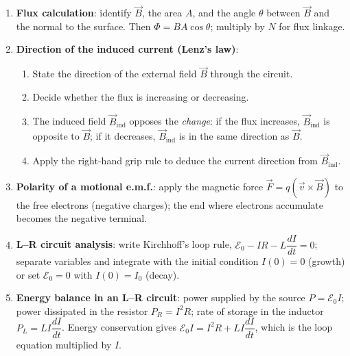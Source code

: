 \documentclass[11pt]{article}
\newcounter{popsec}
\newcounter{popsub}
\newcommand{\courssub}[1]{%
  \stepcounter{popsub}%
  \par\vspace{9pt}\noindent{\popxbold\fontsize{11.5}{13}\selectfont\color{popink}{\color{poporange}\thepopsec.\thepopsub}\hspace{6pt}#1}\par\nopagebreak\vspace{4pt}
}
\begin{document}
\courssub{Standard Methods}
\begin{enumerate}
\item \textbf{Flux calculation}: identify $\vec{B}$, the area $A$, and the angle $\theta$ between $\vec{B}$ and the normal to the surface. Then $\Phi = BA\cos\theta$; multiply by $N$ for flux linkage.
\item \textbf{Direction of the induced current (Lenz's law)}:
      \begin{enumerate}
      \item State the direction of the external field $\vec{B}$ through the circuit.
      \item Decide whether the flux is increasing or decreasing.
      \item The induced field $\vec{B}_{\text{ind}}$ opposes the \emph{change}: if the flux increases, $\vec{B}_{\text{ind}}$ is opposite to $\vec{B}$; if it decreases, $\vec{B}_{\text{ind}}$ is in the same direction as $\vec{B}$.
      \item Apply the right-hand grip rule to deduce the current direction from $\vec{B}_{\text{ind}}$.
      \end{enumerate}
\item \textbf{Polarity of a motional e.m.f.}: apply the magnetic force $\vec{F} = q(\vec{v}\times\vec{B})$ to the free electrons (negative charges); the end where electrons accumulate becomes the negative terminal.
\item \textbf{L--R circuit analysis}: write Kirchhoff's loop rule, $\mathcal{E}_0 - IR - L\dfrac{dI}{dt} = 0$; separate variables and integrate with the initial condition $I(0)=0$ (growth) or set $\mathcal{E}_0 = 0$ with $I(0)=I_0$ (decay).
\item \textbf{Energy balance in an L--R circuit}: power supplied by the source $P = \mathcal{E}_0 I$; power dissipated in the resistor $P_R = I^2R$; rate of storage in the inductor $P_L = LI\dfrac{dI}{dt}$. Energy conservation gives $\mathcal{E}_0 I = I^2R + LI\dfrac{dI}{dt}$, which is the loop equation multiplied by $I$.
\end{enumerate}
\end{document}
